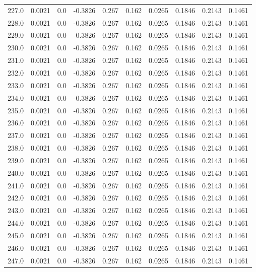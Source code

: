 \begin{longtable}{lrrrrrrrrr}
227.0 & 0.0021 & 0.0 & -0.3826 & 0.267 & 0.162 & 0.0265 & 0.1846 & 0.2143 & 0.1461 \\
228.0 & 0.0021 & 0.0 & -0.3826 & 0.267 & 0.162 & 0.0265 & 0.1846 & 0.2143 & 0.1461 \\
229.0 & 0.0021 & 0.0 & -0.3826 & 0.267 & 0.162 & 0.0265 & 0.1846 & 0.2143 & 0.1461 \\
230.0 & 0.0021 & 0.0 & -0.3826 & 0.267 & 0.162 & 0.0265 & 0.1846 & 0.2143 & 0.1461 \\
231.0 & 0.0021 & 0.0 & -0.3826 & 0.267 & 0.162 & 0.0265 & 0.1846 & 0.2143 & 0.1461 \\
232.0 & 0.0021 & 0.0 & -0.3826 & 0.267 & 0.162 & 0.0265 & 0.1846 & 0.2143 & 0.1461 \\
233.0 & 0.0021 & 0.0 & -0.3826 & 0.267 & 0.162 & 0.0265 & 0.1846 & 0.2143 & 0.1461 \\
234.0 & 0.0021 & 0.0 & -0.3826 & 0.267 & 0.162 & 0.0265 & 0.1846 & 0.2143 & 0.1461 \\
235.0 & 0.0021 & 0.0 & -0.3826 & 0.267 & 0.162 & 0.0265 & 0.1846 & 0.2143 & 0.1461 \\
236.0 & 0.0021 & 0.0 & -0.3826 & 0.267 & 0.162 & 0.0265 & 0.1846 & 0.2143 & 0.1461 \\
237.0 & 0.0021 & 0.0 & -0.3826 & 0.267 & 0.162 & 0.0265 & 0.1846 & 0.2143 & 0.1461 \\
238.0 & 0.0021 & 0.0 & -0.3826 & 0.267 & 0.162 & 0.0265 & 0.1846 & 0.2143 & 0.1461 \\
239.0 & 0.0021 & 0.0 & -0.3826 & 0.267 & 0.162 & 0.0265 & 0.1846 & 0.2143 & 0.1461 \\
240.0 & 0.0021 & 0.0 & -0.3826 & 0.267 & 0.162 & 0.0265 & 0.1846 & 0.2143 & 0.1461 \\
241.0 & 0.0021 & 0.0 & -0.3826 & 0.267 & 0.162 & 0.0265 & 0.1846 & 0.2143 & 0.1461 \\
242.0 & 0.0021 & 0.0 & -0.3826 & 0.267 & 0.162 & 0.0265 & 0.1846 & 0.2143 & 0.1461 \\
243.0 & 0.0021 & 0.0 & -0.3826 & 0.267 & 0.162 & 0.0265 & 0.1846 & 0.2143 & 0.1461 \\
244.0 & 0.0021 & 0.0 & -0.3826 & 0.267 & 0.162 & 0.0265 & 0.1846 & 0.2143 & 0.1461 \\
245.0 & 0.0021 & 0.0 & -0.3826 & 0.267 & 0.162 & 0.0265 & 0.1846 & 0.2143 & 0.1461 \\
246.0 & 0.0021 & 0.0 & -0.3826 & 0.267 & 0.162 & 0.0265 & 0.1846 & 0.2143 & 0.1461 \\
247.0 & 0.0021 & 0.0 & -0.3826 & 0.267 & 0.162 & 0.0265 & 0.1846 & 0.2143 & 0.1461 \\

\end{longtable}
